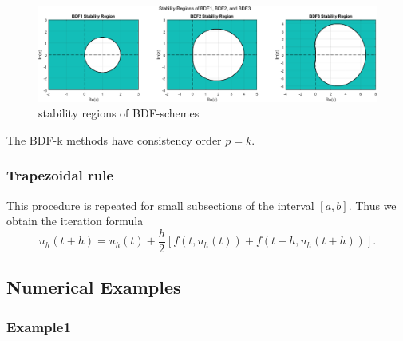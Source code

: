 	\begin{frame}
		\begin{figure}[H]
			\centering
			\includegraphics[width=1\linewidth]{../Tex/pictures/bdf_stability_regions.png}
			\caption{stability regions of BDF-schemes}
			\label{fig:screenshot020}
		\end{figure}
		\begin{theorem}%
			The BDF-k methods have consistency order $p=k$.
		\end{theorem}
	\end{frame}
	
	\subsubsection{Trapezoidal rule}
	
	\begin{frame}
		This procedure is repeated for small subsections of the interval $[a,b]$. Thus we obtain the iteration formula
		\begin{displaymath}
			u_h (t+h) = u_h(t) +\frac{h}{2}[f(t,u_h(t)) + f(t+h, u_h(t+h))].
		\end{displaymath}
	\end{frame}
	
	\subsection*{Numerical Examples}
	
	\subsubsection{Example1}
	
